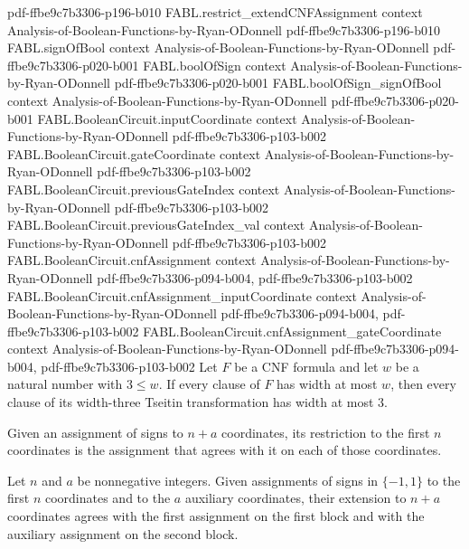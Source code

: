 \begin{theorem}
  {pdf-ffbe9c7b3306-p196-b010}
\proofstep
  {FABL.restrict_extendCNFAssignment}
  {context}
  {Analysis-of-Boolean-Functions-by-Ryan-ODonnell}
  {pdf-ffbe9c7b3306-p196-b010}
\proofstep
  {FABL.signOfBool}
  {context}
  {Analysis-of-Boolean-Functions-by-Ryan-ODonnell}
  {pdf-ffbe9c7b3306-p020-b001}
\proofstep
  {FABL.boolOfSign}
  {context}
  {Analysis-of-Boolean-Functions-by-Ryan-ODonnell}
  {pdf-ffbe9c7b3306-p020-b001}
\proofstep
  {FABL.boolOfSign_signOfBool}
  {context}
  {Analysis-of-Boolean-Functions-by-Ryan-ODonnell}
  {pdf-ffbe9c7b3306-p020-b001}
\proofstep
  {FABL.BooleanCircuit.inputCoordinate}
  {context}
  {Analysis-of-Boolean-Functions-by-Ryan-ODonnell}
  {pdf-ffbe9c7b3306-p103-b002}
\proofstep
  {FABL.BooleanCircuit.gateCoordinate}
  {context}
  {Analysis-of-Boolean-Functions-by-Ryan-ODonnell}
  {pdf-ffbe9c7b3306-p103-b002}
\proofstep
  {FABL.BooleanCircuit.previousGateIndex}
  {context}
  {Analysis-of-Boolean-Functions-by-Ryan-ODonnell}
  {pdf-ffbe9c7b3306-p103-b002}
\proofstep
  {FABL.BooleanCircuit.previousGateIndex_val}
  {context}
  {Analysis-of-Boolean-Functions-by-Ryan-ODonnell}
  {pdf-ffbe9c7b3306-p103-b002}
\proofstep
  {FABL.BooleanCircuit.cnfAssignment}
  {context}
  {Analysis-of-Boolean-Functions-by-Ryan-ODonnell}
  {pdf-ffbe9c7b3306-p094-b004,
    pdf-ffbe9c7b3306-p103-b002}
\proofstep
  {FABL.BooleanCircuit.cnfAssignment_inputCoordinate}
  {context}
  {Analysis-of-Boolean-Functions-by-Ryan-ODonnell}
  {pdf-ffbe9c7b3306-p094-b004,
    pdf-ffbe9c7b3306-p103-b002}
\proofstep
  {FABL.BooleanCircuit.cnfAssignment_gateCoordinate}
  {context}
  {Analysis-of-Boolean-Functions-by-Ryan-ODonnell}
  {pdf-ffbe9c7b3306-p094-b004,
    pdf-ffbe9c7b3306-p103-b002}
Let $F$ be a CNF formula and let $w$ be a natural number with $3\leq w$. If every clause
of $F$ has width at most $w$, then every clause of its width-three Tseitin
transformation has width at most $3$.
\end{theorem}

\begin{definition}
\label{FABL.restrictCNFAssignment}
\leanok
Given an assignment of signs to $n+a$ coordinates, its restriction to the first $n$
coordinates is the assignment that agrees with it on each of those coordinates.
\end{definition}

\begin{definition}
\label{FABL.extendCNFAssignment}
\leanok
Let $n$ and $a$ be nonnegative integers. Given assignments of signs in $\{-1,1\}$ to the
first $n$ coordinates and to the $a$ auxiliary coordinates, their extension to $n+a$
coordinates agrees with the first assignment on the first block and with the auxiliary
assignment on the second block.
\end{definition}

